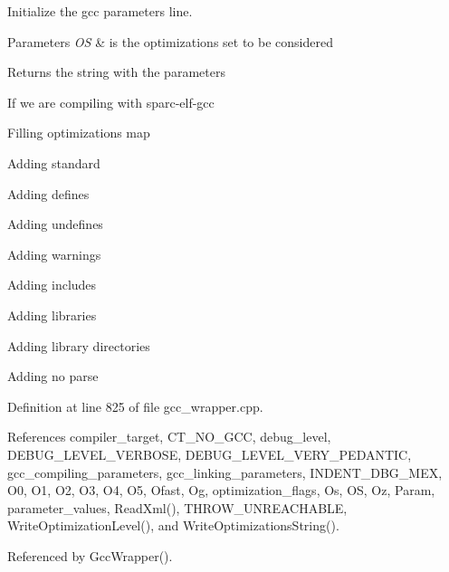 Initialize the gcc parameters line. 


\begin{DoxyParams}{Parameters}
{\em OS} & is the optimizations set to be considered \\
\hline
\end{DoxyParams}
\begin{DoxyReturn}{Returns}
the string with the parameters 
\end{DoxyReturn}
If we are compiling with sparc-\/elf-\/gcc

Filling optimizations map

Adding standard

Adding defines

Adding undefines

Adding warnings

Adding includes

Adding libraries

Adding library directories

Adding no parse 

Definition at line 825 of file gcc\+\_\+wrapper.\+cpp.



References compiler\+\_\+target, C\+T\+\_\+\+N\+O\+\_\+\+G\+CC, debug\+\_\+level, D\+E\+B\+U\+G\+\_\+\+L\+E\+V\+E\+L\+\_\+\+V\+E\+R\+B\+O\+SE, D\+E\+B\+U\+G\+\_\+\+L\+E\+V\+E\+L\+\_\+\+V\+E\+R\+Y\+\_\+\+P\+E\+D\+A\+N\+T\+IC, gcc\+\_\+compiling\+\_\+parameters, gcc\+\_\+linking\+\_\+parameters, I\+N\+D\+E\+N\+T\+\_\+\+D\+B\+G\+\_\+\+M\+EX, O0, O1, O2, O3, O4, O5, Ofast, Og, optimization\+\_\+flags, Os, OS, Oz, Param, parameter\+\_\+values, Read\+Xml(), T\+H\+R\+O\+W\+\_\+\+U\+N\+R\+E\+A\+C\+H\+A\+B\+LE, Write\+Optimization\+Level(), and Write\+Optimizations\+String().



Referenced by Gcc\+Wrapper().

